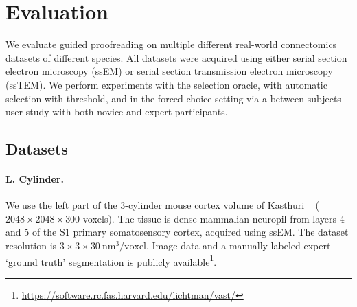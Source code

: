 
\section{Evaluation}
\label{sec:evaluation}

We evaluate guided proofreading on multiple different real-world connectomics datasets of different species. All datasets were acquired using either serial section electron microscopy (ssEM) or serial section transmission electron microscopy (ssTEM). We perform experiments with the selection oracle, with automatic selection with threshold, and in the forced choice setting via a between-subjects user study with both novice and expert participants.

\subsection{Datasets}

\paragraph{L. Cylinder.} We use the left part of the 3-cylinder mouse cortex volume of Kasthuri \etal~\cite{kasthuri2015saturated} ($2048\times2048\times300$ voxels). The tissue is dense mammalian neuropil from layers 4 and 5 of the S1 primary somatosensory cortex, acquired using ssEM. The dataset resolution is $3\times3\times30~\text{nm}^3\text{/voxel}$. Image data and a manually-labeled expert `ground truth' segmentation is publicly available\footnote{\scriptsize{\url{https://software.rc.fas.harvard.edu/lichtman/vast/}}}.

